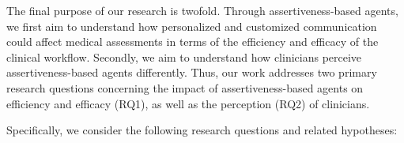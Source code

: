 The final purpose of our research is twofold.
Through assertiveness-based agents, we first aim to understand how personalized and customized communication could affect medical assessments in terms of the efficiency and efficacy of the clinical workflow.
Secondly, we aim to understand how clinicians perceive assertiveness-based agents differently.
Thus, our work addresses two primary research questions concerning the impact of assertiveness-based agents on efficiency and efficacy (RQ1), as well as the perception (RQ2) of clinicians.

\vspace{2.5mm}

\noindent
Specifically, we consider the following research questions and related hypotheses:

\vspace{0.5mm}

